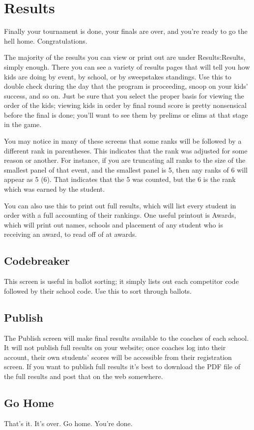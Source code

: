 \documentclass[12pt]{report} \usepackage {fullpage} \usepackage{times}
\begin{document}
\chapter{Results}

Finally your tournament is done, your finals are over, and you're ready to
go the hell home.   Congratulations.

The majority of the results you can view or print out are under
Results:Results, simply enough.   There you can see a variety of results
pages that will tell you how kids are doing by event, by school, or by
sweepstakes standings.   Use this to double check during the day that the
program is proceeding, snoop on your kids' success, and so on.   Just be
sure that you select the proper basis for viewing the order of the kids;
viewing kids in order by final round score is pretty nonsensical before the
final is done; you'll want to see them by prelims or elims at that stage in
the game.

You may notice in many of these screens that some ranks will be followed by
a different rank in parentheses.  This indicates that the rank was adjusted
for some reason or another.   For instance, if you are truncating all ranks
to the size of the smallest panel of that event, and the smallest panel is
5, then any ranks of 6 will appear as 5 (6).  That indicates that the 5 was
counted, but the 6 is the rank which was earned by the student.

You can also use this to print out full results, which will list every
student in order with a full accounting of their rankings.    One useful
printout is Awards, which will print out names, schools and placement of
any student who is receiving an award, to read off of at awards.

\section{Codebreaker}

This screen is useful in ballot sorting; it simply lists out each
competitor code followed by their school code.   Use this to sort through
ballots.

\section{Publish}

The Publish screen will make final results available to the coaches of each
school.  It will not publish full results on your website; once coaches log
into their account, their own students' scores will be accessible from
their registration screen.   If you want to publish full  results it's best
to download the PDF file of the full results and post that on the web
somewhere.

\section{Go Home}

That's it.  It's over.  Go home.  You're done.
\end{document}
